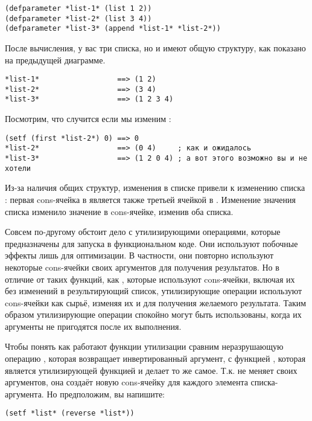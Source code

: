 \begin{lstlisting}
(defparameter *list-1* (list 1 2))
(defparameter *list-2* (list 3 4))
(defparameter *list-3* (append *list-1* *list-2*))
\end{lstlisting}

После вычисления, у вас три списка, но  и  имеют общую
структуру, как показано на предыдущей диаграмме.

\begin{lstlisting}
*list-1*                  ==> (1 2)
*list-2*                  ==> (3 4)
*list-3*                  ==> (1 2 3 4)
\end{lstlisting}

Посмотрим, что случится если мы изменим :

\begin{lstlisting}
(setf (first *list-2*) 0) ==> 0
*list-2*                  ==> (0 4)     ; как и ожидалось
*list-3*                  ==> (1 2 0 4) ; а вот этого возможно вы и не хотели
\end{lstlisting}

Из-за наличия общих структур, изменения в списке  привели к изменению списка
: первая cons-ячейка в  является также третьей ячейкой в
. Изменение значения  списка  изменило значение
 в cons-ячейке, изменив оба списка.

Совсем по-другому обстоит дело с утилизирующими операциями, которые предназначены для
запуска в функциональном коде. Они используют побочные эффекты лишь для оптимизации. В
частности, они повторно используют некоторые cons-ячейки своих аргументов для получения
результатов. Но в отличие от таких функций, как , которые используют
cons-ячейки, включая их без изменений в результирующий список, утилизирующие операции
используют cons-ячейки как сырьё, изменяя их  и  для получения
желаемого результата. Таким образом утилизирующие операции спокойно могут быть
использованы, когда их аргументы не пригодятся после их выполнения.

Чтобы понять как работают функции утилизации сравним неразрушающую операцию
, которая возвращает инвертированный аргумент, с функцией ,
которая является утилизирующей функцией и делает то же самое. Т.к.  не
меняет своих аргументов, она создаёт новую cons-ячейку для каждого элемента
списка-аргумента. Но предположим, вы напишите:

\begin{lstlisting}
(setf *list* (reverse *list*))
\end{lstlisting}

